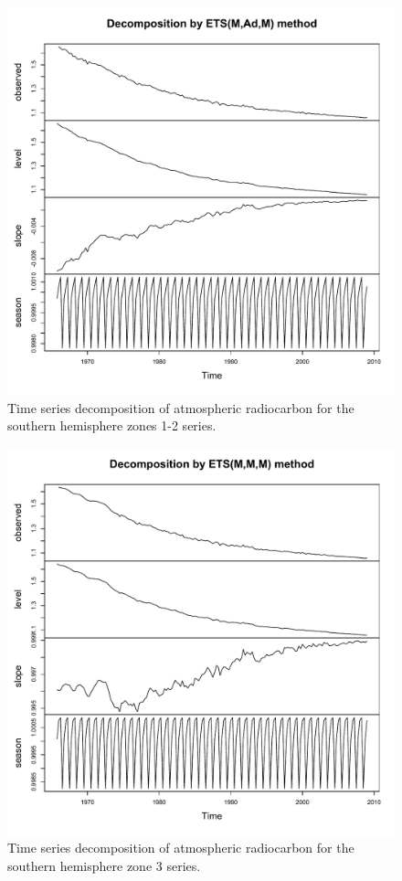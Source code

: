 \documentclass[draft,grl]{agutexSI}
\begin{document}
\begin{figure}[htbp]
   \centering
   \includegraphics[scale=0.7]{Figures/tsSHZ12} %
   \caption{Time series decomposition of atmospheric radiocarbon for the southern hemisphere zones 1-2 series. }
   \label{fig:tsSHZ12}
\end{figure}

\begin{figure}[htbp]
   \centering
   \includegraphics[scale=0.7]{Figures/tsSHZ3} %
   \caption{Time series decomposition of atmospheric radiocarbon for the southern hemisphere zone 3 series. }
   \label{fig:tsSHZ3}
\end{figure}
\end{document}
